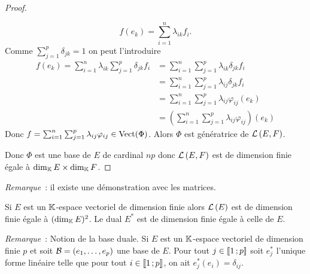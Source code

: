 \begin{proof}
\begin{enumerate}
    \begin{equation}
      f(e_k)= \sum_{i=1}^n \lambda_{ik} f_i.
    \end{equation}
    Comme $\sum_{j=1}^p \delta_{jk}=1$ on peut l'introduire
    \begin{align}
      f(e_k) = \sum_{i=1}^n \lambda_{ik} \sum_{j=1}^p \delta_{jk} f_i &= \sum_{i=1}^n \sum_{j=1}^p \lambda_{ik} \delta_{jk} f_i \\
      &=\sum_{i=1}^n \sum_{j=1}^p \lambda_{ij} \delta_{jk} f_i\\
      &=\sum_{i=1}^n \sum_{j=1}^p \lambda_{ij} \varphi_{ij}(e_k)\\
      &=\left(\sum_{i=1}^n \sum_{j=1}^p \lambda_{ij} \varphi_{ij}\right)(e_k)
    \end{align}
    Donc $f=\sum_{i=1}^n \sum_{j=1}^p \lambda_{ij} \varphi_{ij} \in \operatorname{Vect}(\Phi)$. Alors $\Phi$ est génératrice de $\mathcal{L}\left(E,F\right)$.
  \end{enumerate}
  Donc $\Phi$ est une base de $E$ de cardinal $np$ donc $\mathcal{L}\left(E,F\right)$ est de dimension finie égale à $\operatorname{dim}_{\mathbb{K}} E \times \operatorname{dim}_{\mathbb{K}} F$.
\end{proof}

\emph{Remarque}~: il existe une démonstration avec les matrices.

\begin{corth}
  Si $E$ est un $\mathbb{K}$-espace vectoriel de dimension finie alors $\mathcal{L}\left(E\right)$ est de dimension finie égale à $(\operatorname{dim}_{\mathbb{K}} E)^2$. Le dual $E^*$ est de dimension finie égale à celle de $E$.
\end{corth}

\emph{Remarque}~: Notion de la base duale. Si $E$ est un $\mathbb{K}$-espace vectoriel de dimension finie $p$ et soit $\mathcal{B}=(e_1, \ldots, e_p)$ une base de $E$. Pour tout $j \in  \mathopen{\llbracket}1\mathclose{}\mathpunct{};p\mathclose{\rrbracket}$ soit $e_j^*$ l'unique forme linéaire telle que pour tout $i \in  \mathopen{\llbracket}1\mathclose{}\mathpunct{};p\mathclose{\rrbracket}$, on ait $e_j^*(e_i)=\delta_{ij}$.

